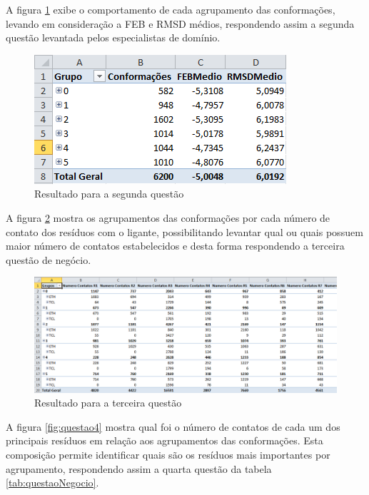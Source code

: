 \newpage

A figura \ref{fig:questao2} exibe o comportamento de cada agrupamento das conformações, levando em consideração a FEB e RMSD médios, respondendo assim a segunda questão levantada pelos especialistas de domínio.

\begin{figure}[h]
        \center
        \includegraphics[scale=0.8]{images/Questao2.PNG}
        \caption{Resultado para a segunda questão}
        \label{fig:questao2}
\end{figure}

A figura \ref{fig:questao3} mostra os agrupamentos das conformações por cada número de contato dos resíduos com o ligante, possibilitando levantar qual ou quais possuem maior número de contatos estabelecidos e desta forma respondendo a terceira questão de negócio. 

\begin{figure}[h]
        \center
        \includegraphics[scale=0.62]{images/Questao3.PNG}
        \caption{Resultado para a terceira questão}
        \label{fig:questao3}
\end{figure}

\newpage

A figura \ref{fig:questao4} mostra qual foi o número de contatos de cada um dos principais resíduos em relação aos agrupamentos das conformações. Esta composição permite identificar quais são os resíduos mais importantes por agrupamento, respondendo assim a quarta questão da tabela \ref{tab:questaoNegocio}.

